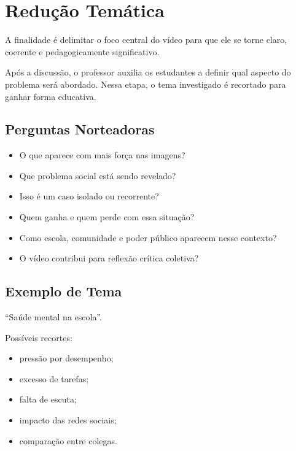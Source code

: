 \documentclass[
  letterpaper,
  DIV=11,
  numbers=noendperiod]{scrreport}
\providecommand{\tightlist}{%
  \setlength{\itemsep}{0pt}\setlength{\parskip}{0pt}}
\begin{document}
\section{Redução Temática}\label{reduuxe7uxe3o-temuxe1tica}

A finalidade é delimitar o foco central do vídeo para que ele se torne
claro, coerente e pedagogicamente significativo.

Após a discussão, o professor auxilia os estudantes a definir qual
aspecto do problema será abordado. Nessa etapa, o tema investigado é
recortado para ganhar forma educativa.

\subsection{Perguntas Norteadoras}\label{perguntas-norteadoras}

\begin{itemize}
\tightlist
\item
  O que aparece com mais força nas imagens?
\item
  Que problema social está sendo revelado?
\item
  Isso é um caso isolado ou recorrente?
\item
  Quem ganha e quem perde com essa situação?
\item
  Como escola, comunidade e poder público aparecem nesse contexto?
\item
  O vídeo contribui para reflexão crítica coletiva?
\end{itemize}

\subsection{Exemplo de Tema}\label{exemplo-de-tema}

``Saúde mental na escola''.

Possíveis recortes:

\begin{itemize}
\tightlist
\item
  pressão por desempenho;
\item
  excesso de tarefas;
\item
  falta de escuta;
\item
  impacto das redes sociais;
\item
  comparação entre colegas.
\end{itemize}
\end{document}
